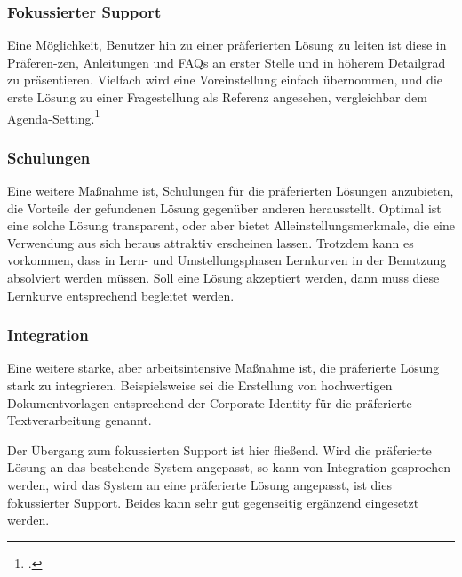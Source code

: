 \subsubsection{Fokussierter Support}
Eine Möglichkeit, Benutzer hin zu einer präferierten Lösung zu leiten ist diese in Präferen-zen, Anleitungen und FAQs an erster Stelle und in höherem Detailgrad zu präsentieren. Vielfach wird eine Voreinstellung einfach übernommen, und die erste Lösung zu einer Fragestellung als Referenz angesehen, vergleichbar dem Agenda-Setting.\footcite[Vgl.][]{bonfadelli_medienwirkungsforschung_2015}

\subsubsection{Schulungen}
Eine weitere Maßnahme ist, Schulungen für die präferierten Lösungen anzubieten, die Vorteile der gefundenen Lösung gegenüber anderen herausstellt. Optimal ist eine solche Lösung transparent, oder aber bietet Alleinstellungsmerkmale, die eine Verwendung aus sich heraus attraktiv erscheinen lassen. Trotzdem kann es vorkommen, dass in Lern- und Umstellungsphasen Lernkurven in der Benutzung absolviert werden müssen. Soll eine Lösung akzeptiert werden, dann muss diese Lernkurve entsprechend begleitet werden.

\subsubsection{Integration}
Eine weitere starke, aber arbeitsintensive Maßnahme ist, die präferierte Lösung stark zu integrieren. Beispielsweise sei die Erstellung von hochwertigen Dokumentvorlagen entsprechend der Corporate Identity für die präferierte Textverarbeitung genannt.

Der Übergang zum fokussierten Support ist hier fließend. Wird die präferierte Lösung an das bestehende System angepasst, so kann von Integration gesprochen werden, wird das System an eine präferierte Lösung angepasst, ist dies fokussierter Support. Beides kann sehr gut gegenseitig ergänzend eingesetzt werden.